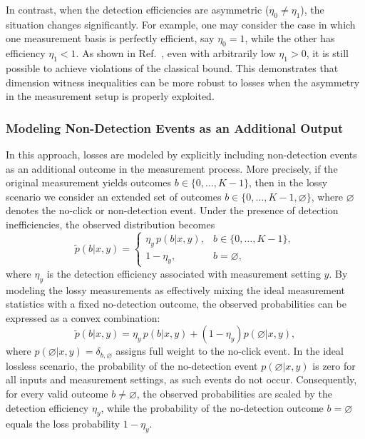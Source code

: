 \documentclass[aps,pra,reprint, superscriptaddress,showkeys]{revtex4-2}
\theoremstyle{plain}
\begin{document}
In contrast, when the detection efficiencies are asymmetric (\(\eta_0 \neq \eta_1\)), the situation changes significantly. For example, one may consider the case in which one measurement basis is perfectly efficient, say \(\eta_0 = 1\), while the other has efficiency \(\eta_1 < 1\). As shown in Ref.~\cite{li2015}, even with arbitrarily low \(\eta_1 > 0\), it is still possible to achieve violations of the classical bound. This demonstrates that dimension witness inequalities can be more robust to losses when the asymmetry in the measurement setup is properly exploited.

\subsubsection{Modeling Non-Detection Events as an Additional Output}
In this approach, losses are modeled by explicitly including non-detection events as an additional outcome in the measurement process. More precisely, if the original measurement yields outcomes \(b \in \{0, \ldots, K{-}1\}\), then in the lossy scenario we consider an extended set of outcomes \(b \in \{0, \ldots, K{-}1, \varnothing\}\), where \(\varnothing\) denotes the no-click or non-detection event. Under the presence of detection inefficiencies, the observed distribution becomes
\begin{equation}
    \tilde{p}(b|x,y) =
\begin{cases}
\eta_y\, p(b|x,y), & b \in \{0, \ldots, K{-}1\}, \\
1 - \eta_y, & b = \varnothing,
\end{cases}
\end{equation}
where \(\eta_y\) is the detection efficiency associated with measurement setting \(y\). By modeling the lossy measurements as effectively mixing the ideal measurement statistics with a fixed no-detection outcome, the observed probabilities can be expressed as a convex combination:
\begin{equation}
    \tilde{p}(b|x,y) = \eta_y\, p(b|x,y) + (1 - \eta_y) p(\varnothing|x,y),
\end{equation}
where \(p(\varnothing|x,y) = \delta_{b,\varnothing}\) assigns full weight to the no-click event. In the ideal lossless scenario, the probability of the no-detection event \(p(\varnothing|x,y)\) is zero for all inputs and measurement settings, as such events do not occur. Consequently, for every valid outcome \(b \neq \varnothing\), the observed probabilities are scaled by the detection efficiency \(\eta_y\), while the probability of the no-detection outcome \(b = \varnothing\) equals the loss probability \(1 - \eta_y\).
\end{document}
